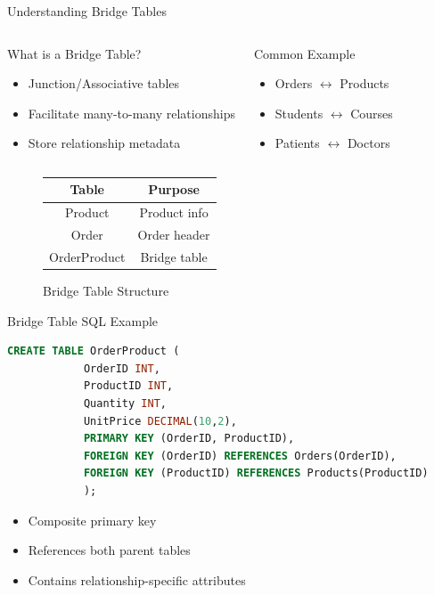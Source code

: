 \documentclass{beamer}
\begin{document}
	\begin{frame}{Understanding Bridge Tables}
		\begin{columns}
			\begin{block}{What is a Bridge Table?}
				\begin{itemize}
					\item Junction/Associative tables
					\item Facilitate many-to-many relationships
					\item Store relationship metadata
				\end{itemize}
			\end{block}
			\begin{exampleblock}{Common Example}
				\begin{itemize}
					\item Orders $\leftrightarrow$ Products
					\item Students $\leftrightarrow$ Courses
					\item Patients $\leftrightarrow$ Doctors
				\end{itemize}
			\end{exampleblock}
		\end{columns}
		\vspace{0.5cm}
		\begin{figure}
			\centering
			\begin{tabular}{|c|c|}
				\hline
				\textbf{Table} & \textbf{Purpose} \\
				\hline
				Product & Product info \\
				Order & Order header \\
				OrderProduct & Bridge table \\
				\hline
			\end{tabular}
			\caption{Bridge Table Structure}
		\end{figure}
	\end{frame}
	
	\begin{frame}[fragile]{Bridge Table SQL Example}
		\begin{lstlisting}[language=SQL, caption=Typical Bridge Table]
			CREATE TABLE OrderProduct (
			OrderID INT,
			ProductID INT,
			Quantity INT,
			UnitPrice DECIMAL(10,2),
			PRIMARY KEY (OrderID, ProductID),
			FOREIGN KEY (OrderID) REFERENCES Orders(OrderID),
			FOREIGN KEY (ProductID) REFERENCES Products(ProductID)
			);
		\end{lstlisting}
		\begin{itemize}
			\item Composite primary key
			\item References both parent tables
			\item Contains relationship-specific attributes
		\end{itemize}
	\end{frame}
	
\end{document}
